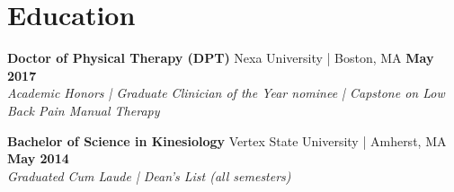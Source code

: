 \documentclass[10pt,letterpaper]{article}
\begin{document}
\section*{Education}
\noindent
\textbf{Doctor of Physical Therapy (DPT)} \hfill Nexa University | Boston, MA \hfill \textbf{May 2017} \\
\textit{Academic Honors | Graduate Clinician of the Year nominee | Capstone on Low Back Pain Manual Therapy}

\vspace{0.3em}
\noindent
\textbf{Bachelor of Science in Kinesiology} \hfill Vertex State University | Amherst, MA \hfill \textbf{May 2014} \\
\textit{Graduated Cum Laude | Dean's List (all semesters)}
\end{document}
